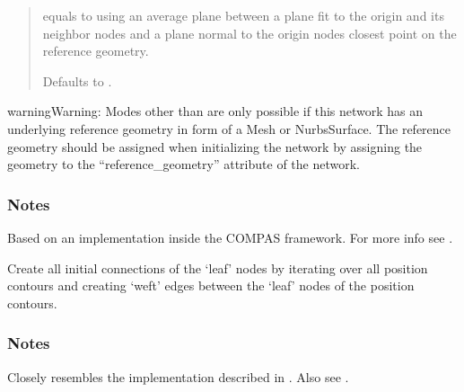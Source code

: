 \documentclass[letterpaper,10pt,english]{sphinxmanual}
\begin{document}
\begin{fulllineitems}
\begin{fulllineitems}
\begin{quote}
\begin{description}
 equals to using an average plane between a plane fit to the
origin and its neighbor nodes and a plane normal to the origin
nodes closest point on the reference geometry.

Defaults to .


\end{description}\end{quote}

\begin{sphinxadmonition}{warning}{Warning:}
Modes other than  are only possible if this network has an
underlying reference geometry in form of a Mesh or NurbsSurface. The
reference geometry should be assigned when initializing the network by
assigning the geometry to the “reference\_geometry” attribute of the
network.
\end{sphinxadmonition}
\subsubsection*{Notes}

Based on an implementation inside the COMPAS framework.
For more info see \sphinxfootnotemark[16].

\end{fulllineitems}


\begin{fulllineitems}
\label{\detokenize{cockatoo:cockatoo.KnitNetwork.initialize_leaf_connections}}
Create all initial connections of the ‘leaf’ nodes by iterating over
all position contours and creating ‘weft’ edges between the ‘leaf’
nodes of the position contours.
\subsubsection*{Notes}

Closely resembles the implementation described in  \sphinxfootnotemark[1]. Also see
 \sphinxfootnotemark[2].


\end{fulllineitems}
\end{fulllineitems}
\end{document}
